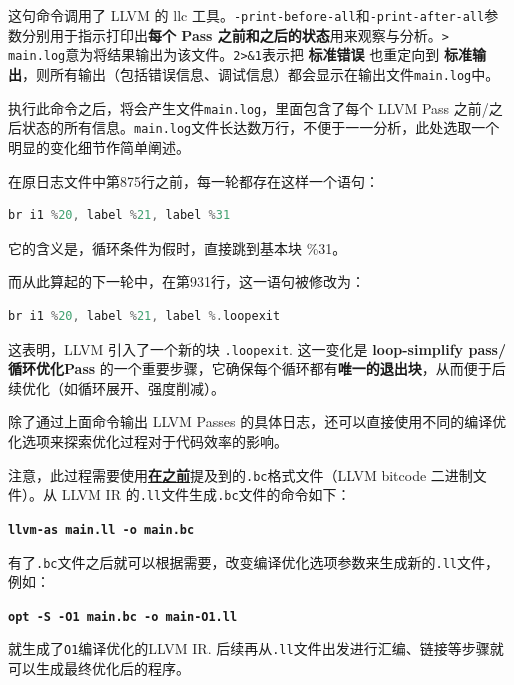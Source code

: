 \documentclass[UTF8,a4paper,10pt]{ctexart}
\begin{document}
这句命令调用了 LLVM 的 llc 工具。\texttt{-print-before-all}和\texttt{-print-after-all}参数分别用于指示打印出\textbf{每个 Pass 之前和之后的状态}用来观察与分析。\texttt{> main.log}意为将结果输出为该文件。\texttt{2>\&1}表示把 \textbf{标准错误} 也重定向到 \textbf{标准输出}，则所有输出（包括错误信息、调试信息）都会显示在输出文件\texttt{main.log}中。

执行此命令之后，将会产生文件\texttt{main.log}，里面包含了每个 LLVM Pass 之前/之后状态的所有信息。\texttt{main.log}文件长达数万行，不便于一一分析，此处选取一个明显的变化细节作简单阐述。

在原日志文件中第875行之前，每一轮都存在这样一个语句：
\begin{lstlisting}[frame=trbl,language={C++}]
br i1 %20, label %21, label %31
\end{lstlisting}

它的含义是，循环条件为假时，直接跳到基本块 \%31。

而从此算起的下一轮中，在第931行，这一语句被修改为：
\begin{lstlisting}[frame=trbl,language={C++}]
br i1 %20, label %21, label %.loopexit
\end{lstlisting}

这表明，LLVM 引入了一个新的块 \texttt{.loopexit}. 这一变化是 \textbf{loop-simplify pass/循环优化Pass} 的一个重要步骤，它确保每个循环都有\textbf{唯一的退出块}，从而便于后续优化（如循环展开、强度削减）。

\vspace{1em}

除了通过上面命令输出 LLVM Passes 的具体日志，还可以直接使用不同的编译优化选项来探索优化过程对于代码效率的影响。

注意，此过程需要使用\hyperref[we-talked-about-it-here]{\textbf{\textcolor{deepblue}{在之前}}}提及到的\texttt{.bc}格式文件（LLVM bitcode 二进制文件）。从 LLVM IR 的\texttt{.ll}文件生成\texttt{.bc}文件的命令如下：
\begin{center}
    \textcolor{deepblue}{\textbf{\texttt{\large{llvm-as main.ll -o main.bc}}}}
\end{center}

有了\texttt{.bc}文件之后就可以根据需要，改变编译优化选项参数来生成新的\texttt{.ll}文件，例如：
\begin{center}
    \textcolor{deepblue}{\textbf{\texttt{\large{opt -S -O1 main.bc -o main-O1.ll}}}}
\end{center}
就生成了\texttt{O1}编译优化的LLVM IR. 后续再从\texttt{.ll}文件出发进行汇编、链接等步骤就可以生成最终优化后的程序。
\end{document}

